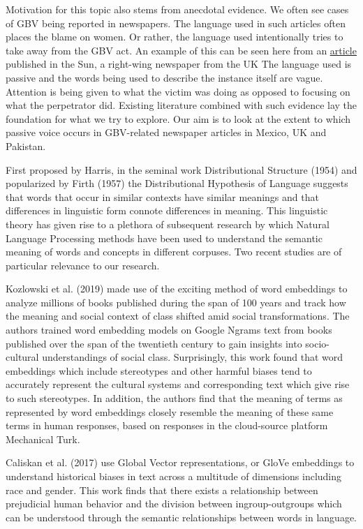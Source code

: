 \documentclass{article}
\begin{document}
{{Motivation for this topic also stems from anecdotal evidence. We often see cases of GBV being reported in newspapers. The language used in such articles often places the blame on women. Or rather, the language used intentionally tries to take away from the GBV act. An example of this can be seen here from an
\textcolor{blue}{\href{https://twitter.com/TheSun/status/755867885910851584}{\underline{article}}} published in the Sun, a right-wing newspaper from the UK
The language used is passive and the words being used to describe the instance itself are vague. Attention is being given to what the victim was doing as opposed to focusing on what the perpetrator did. Existing literature combined with such evidence lay the foundation for what we try to explore. Our aim is to look at the extent to which passive voice occurs in GBV-related newspaper articles in Mexico, UK and Pakistan.

First proposed by Harris, in the seminal work Distributional Structure  (1954)  and popularized by Firth (1957)  the Distributional Hypothesis of Language suggests that words that occur in similar contexts have similar meanings and that differences in linguistic form connote differences in meaning. This linguistic theory has given rise to a plethora of subsequent research by which Natural Language Processing methods have been used to understand the semantic meaning of words and concepts in different corpuses. Two recent studies are of particular relevance to our research.

Kozlowski et al. (2019) made use of the exciting method of word embeddings to analyze millions of books published during the span of 100 years and track how the meaning and social context of class shifted amid social transformations.  The authors trained word embedding models on Google Ngrams text from books published over the span of the twentieth century to gain insights into socio-cultural understandings of social class. Surprisingly, this work found that word embeddings which include stereotypes and other harmful biases tend to accurately represent the cultural systems and corresponding text which give rise to such stereotypes. In addition, the authors find that the meaning of terms as represented by word embeddings closely resemble the meaning of these same terms in human responses, based on responses in the cloud-source platform Mechanical Turk. 

Caliskan et al. (2017) use Global Vector representations, or GloVe embeddings to understand historical biases in text across a multitude of dimensions including race and gender. This work finds that there exists a relationship between prejudicial human behavior and the division between ingroup-outgroups which can be understood through the semantic relationships between words in language.

}}
\end{document}
